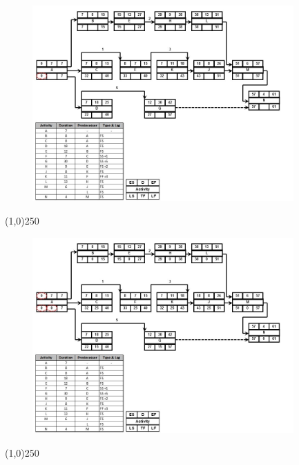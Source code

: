 \begin{frame}
\begin{figure}
	\centering
		\includegraphics[width = 10.0cm]{oldnotes/Slide238.jpg}
\end{figure}
\end{frame}
\begin{center}\line(1,0){250}\end{center}




\begin{frame}
\begin{figure}
	\centering
		\includegraphics[width = 10.0cm]{oldnotes/Slide239.jpg}
\end{figure}
\end{frame}
\begin{center}\line(1,0){250}\end{center}




